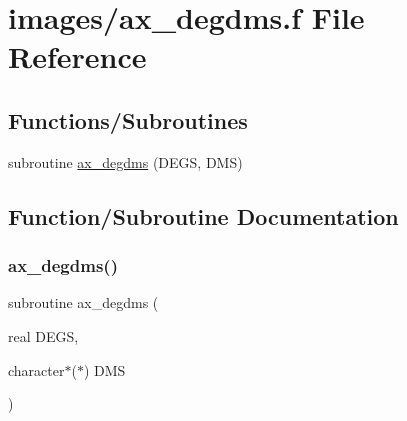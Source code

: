 \hypertarget{ax__degdms_8f}{}\section{images/ax\+\_\+degdms.f File Reference}
\label{ax__degdms_8f}
\subsection*{Functions/\+Subroutines}
\begin{DoxyCompactItemize}
\item 
subroutine \hyperlink{ax__degdms_8f_a1b28d93ffc09846a82537dea7541fa97}{ax\+\_\+degdms} (D\+E\+GS, D\+MS)
\end{DoxyCompactItemize}


\subsection{Function/\+Subroutine Documentation}
\mbox{\label{ax__degdms_8f_a1b28d93ffc09846a82537dea7541fa97}} 
\subsubsection{\texorpdfstring{ax\+\_\+degdms()}{ax\_degdms()}}
{\footnotesize\ttfamily subroutine ax\+\_\+degdms (\begin{DoxyParamCaption}\item[{real}]{D\+E\+GS,  }\item[{character$\ast$($\ast$)}]{D\+MS }\end{DoxyParamCaption})}

